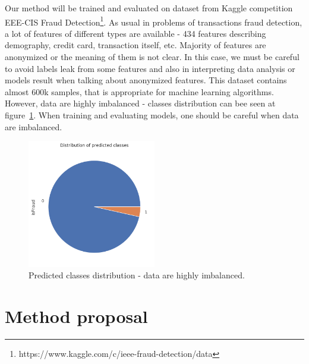 \documentclass[runningheads]{llncs}
\begin{document}
Our method will be trained and evaluated on dataset from Kaggle competition EEE-CIS Fraud Detection\footnote{https://www.kaggle.com/c/ieee-fraud-detection/data}. As usual in problems of transactions fraud detection, a lot of features of different types are available - 434 features describing demography, credit card, transaction itself, etc. Majority of features are anonymized or the meaning of them is not clear. In this case, we must be careful to avoid labels leak from some features and also in interpreting data analysis or models result when talking about anonymized features. This dataset contains almost 600k samples, that is appropriate for machine learning algorithms. However, data are highly imbalanced - classes distribution can bee seen at figure~\ref{fig:classes}. When training and evaluating models, one should be careful when data are imbalanced.

\begin{figure}[ht]
	\begin{center}
	    \includegraphics[width=0.5\textwidth]{figures/class_distribution.png}
    \end{center}
	\caption{Predicted classes distribution - data are highly imbalanced.}
	\label{fig:classes}
\end{figure}


\section{Method proposal}


\end{document}

